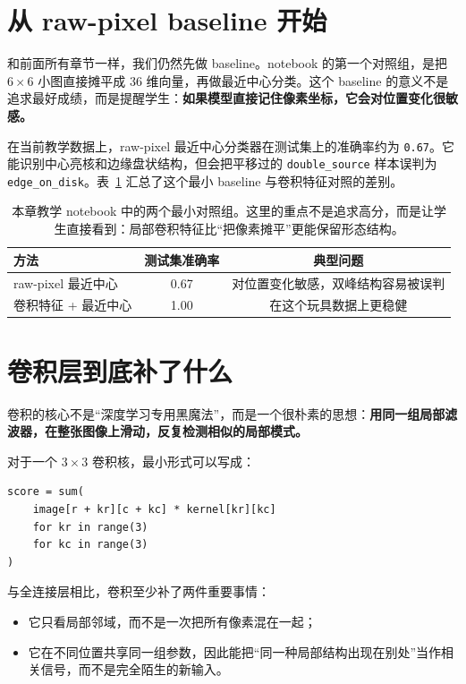 \section{从 raw-pixel baseline 开始}

和前面所有章节一样，我们仍然先做 baseline。notebook 的第一个对照组，是把 \(6\times 6\) 小图直接摊平成 36 维向量，再做最近中心分类。这个 baseline 的意义不是追求最好成绩，而是提醒学生：\textbf{如果模型直接记住像素坐标，它会对位置变化很敏感。}

在当前教学数据上，raw-pixel 最近中心分类器在测试集上的准确率约为 \texttt{0.67}。它能识别中心亮核和边缘盘状结构，但会把平移过的 \texttt{double\_source} 样本误判为 \texttt{edge\_on\_disk}。表~\ref{tab:ch31_baseline_vs_conv} 汇总了这个最小 baseline 与卷积特征对照的差别。

\begin{table}[htbp]
\centering
\begin{tabular}{lcc}
\toprule
方法 & 测试集准确率 & 典型问题 \\
\midrule
raw-pixel 最近中心 & 0.67 & 对位置变化敏感，双峰结构容易被误判 \\
卷积特征 + 最近中心 & 1.00 & 在这个玩具数据上更稳健 \\
\bottomrule
\end{tabular}
\caption{本章教学 notebook 中的两个最小对照组。这里的重点不是追求高分，而是让学生直接看到：局部卷积特征比“把像素摊平”更能保留形态结构。}
\label{tab:ch31_baseline_vs_conv}
\end{table}

\section{卷积层到底补了什么}

卷积的核心不是“深度学习专用黑魔法”，而是一个很朴素的思想：\textbf{用同一组局部滤波器，在整张图像上滑动，反复检测相似的局部模式。}

对于一个 \(3\times 3\) 卷积核，最小形式可以写成：

\begin{examplebox}[一个最小二维卷积]
\begin{lstlisting}[style=pythonstyle]
score = sum(
    image[r + kr][c + kc] * kernel[kr][kc]
    for kr in range(3)
    for kc in range(3)
)
\end{lstlisting}
\end{examplebox}

与全连接层相比，卷积至少补了两件重要事情：

\begin{itemize}
    \item 它只看局部邻域，而不是一次把所有像素混在一起；
    \item 它在不同位置共享同一组参数，因此能把“同一种局部结构出现在别处”当作相关信号，而不是完全陌生的新输入。
\end{itemize}

